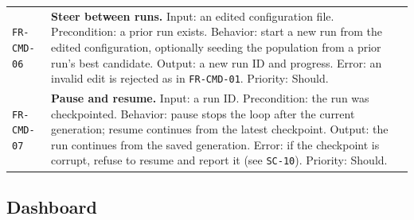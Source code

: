 \documentclass[12pt,a4paper]{article}
\begin{document}
\begin{longtable}{@{}p{2.2cm}p{10.6cm}@{}}
\texttt{FR-CMD-06} & \textbf{Steer between runs.} Input: an edited configuration file. Precondition: a prior run exists. Behavior: start a new run from the edited configuration, optionally seeding the population from a prior run's best candidate. Output: a new run ID and progress. Error: an invalid edit is rejected as in \texttt{FR-CMD-01}. Priority: Should. \\
\addlinespace[2pt]

\texttt{FR-CMD-07} & \textbf{Pause and resume.} Input: a run ID. Precondition: the run was checkpointed. Behavior: pause stops the loop after the current generation; resume continues from the latest checkpoint. Output: the run continues from the saved generation. Error: if the checkpoint is corrupt, refuse to resume and report it (see \texttt{SC-10}). Priority: Should. \\
\bottomrule
\end{longtable}

\subsection{Dashboard}
\end{document}
